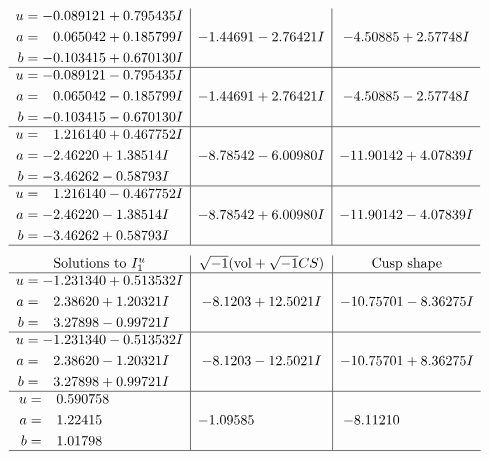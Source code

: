 \documentclass[1p]{elsarticle_modified}
\theoremstyle{definition}
\newcommand{\I}{\sqrt{-1}}
\begin{document}
$$\begin{array}{c|c|c}
\begin{aligned}
u &= -0.089121 + 0.795435 I \\
a &= \phantom{-}0.065042 + 0.185799 I \\
b &= -0.103415 + 0.670130 I\end{aligned}
 & -1.44691 - 2.76421 I & -4.50885 + 2.57748 I \\ \hline\begin{aligned}
u &= -0.089121 - 0.795435 I \\
a &= \phantom{-}0.065042 - 0.185799 I \\
b &= -0.103415 - 0.670130 I\end{aligned}
 & -1.44691 + 2.76421 I & -4.50885 - 2.57748 I \\ \hline\begin{aligned}
u &= \phantom{-}1.216140 + 0.467752 I \\
a &= -2.46220 + 1.38514 I \\
b &= -3.46262 - 0.58793 I\end{aligned}
 & -8.78542 - 6.00980 I & -11.90142 + 4.07839 I \\ \hline\begin{aligned}
u &= \phantom{-}1.216140 - 0.467752 I \\
a &= -2.46220 - 1.38514 I \\
b &= -3.46262 + 0.58793 I\end{aligned}
 & -8.78542 + 6.00980 I & -11.90142 - 4.07839 I\\
 \hline 
 \end{array}$$\newpage$$\begin{array}{c|c|c}  
\text{Solutions to }I^u_{1}& \I (\text{vol} + \sqrt{-1}CS) & \text{Cusp shape}\\
 \hline 
\begin{aligned}
u &= -1.231340 + 0.513532 I \\
a &= \phantom{-}2.38620 + 1.20321 I \\
b &= \phantom{-}3.27898 - 0.99721 I\end{aligned}
 & -8.1203 + 12.5021 I & -10.75701 - 8.36275 I \\ \hline\begin{aligned}
u &= -1.231340 - 0.513532 I \\
a &= \phantom{-}2.38620 - 1.20321 I \\
b &= \phantom{-}3.27898 + 0.99721 I\end{aligned}
 & -8.1203 - 12.5021 I & -10.75701 + 8.36275 I \\ \hline\begin{aligned}
u &= \phantom{-}0.590758\phantom{ +0.000000I} \\
a &= \phantom{-}1.22415\phantom{ +0.000000I} \\
b &= \phantom{-}1.01798\phantom{ +0.000000I}\end{aligned}
 & -1.09585\phantom{ +0.000000I} & -8.11210\phantom{ +0.000000I}\\
 \hline 
 \end{array}$$\newpage\newpage\renewcommand{\arraystretch}{1}
\end{document}
